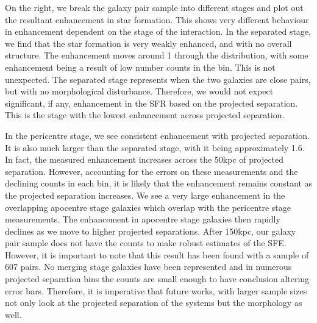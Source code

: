 On the right, we break the galaxy pair sample into different stages and plot out the resultant enhancement in star formation. This shows very different behaviour in enhancement dependent on the stage of the interaction. In the separated stage, we find that the star formation is very weakly enhanced, and with no overall structure. The enhancement moves around 1 through the distribution, with some enhancement being a result of low number counts in the bin. This is not unexpected. The separated stage represents when the two galaxies are close pairs, but with no morphological disturbance. Therefore, we would not expect significant, if any, enhancement in the SFR based on the projected separation. This is the stage with the lowest enhancement across projected separation.

In the pericentre stage, we see consistent enhancement with projected separation. It is also much larger than the separated stage, with it being approximately 1.6. In fact, the measured enhancement increases across the 50kpc of projected separation. However, accounting for the errors on these measurements and the declining counts in each bin, it is likely that the enhancement remains constant as the projected separation increases. We see a very large enhancement in the overlapping apocentre stage galaxies which overlap with the pericentre stage measurements. The enhancement in apocentre stage galaxies then rapidly declines as we move to higher projected separations. After 150kpc, our galaxy pair sample does not have the counts to make robust estimates of the SFE. However, it is important to note that this result has been found with a sample of 607 pairs. No merging stage galaxies have been represented and in numerous projected separation bins the counts are small enough to have conclusion altering error bars. Therefore, it is imperative that future works, with larger sample sizes not only look at the projected separation of the systems but the morphology as well.

